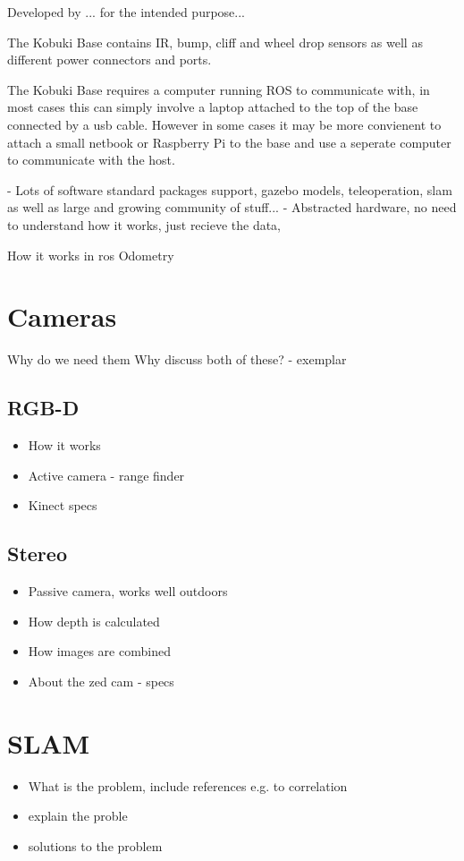 \documentclass{mproj}
\begin{document}
Developed by ... for the intended purpose...

The Kobuki Base contains IR, bump, cliff and wheel drop sensors as well as different power connectors and ports.

The Kobuki Base requires a computer running ROS to communicate with, in most cases this can simply involve a laptop attached to the top of the base connected by a usb cable. However in some cases it may be more convienent to attach a small netbook or Raspberry Pi to the base and use a seperate computer to communicate with the host.

- Lots of software standard packages support, gazebo models, teleoperation, slam as well as large and growing community of stuff...
- Abstracted hardware, no need to understand how it works, just recieve the data,

How it works in ros
Odometry
\section{Cameras}
Why do we need them
Why discuss both of these? - exemplar
\subsection{RGB-D}
\begin{itemize}
  \item How it works
  \item Active camera - range finder
  \item Kinect specs
\end{itemize}
\subsection{Stereo}

\begin{itemize}
  \item Passive camera, works well outdoors
  \item How depth is calculated
  \item How images are combined 
  \item About the zed cam - specs
\end{itemize}

\section{SLAM}
\begin{itemize}

  \item What is the problem, include references e.g. to correlation
  \item explain the proble
  \item solutions to the problem

 
\end{itemize}
\end{document}
